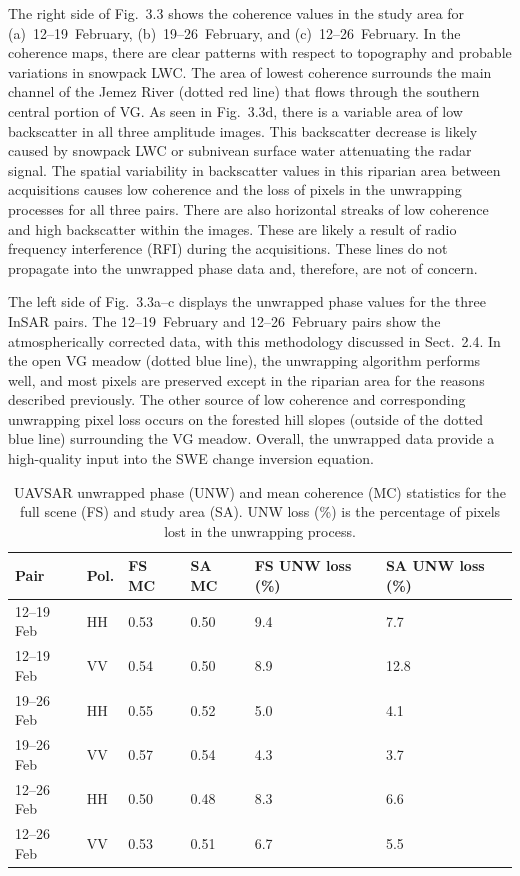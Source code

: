The right side of Fig.~3.3 shows the coherence values in the study area for (a)~12--19~February, (b)~19--26~February, and (c)~12--26~February. In the coherence maps, there are clear patterns with respect to topography and probable variations in snowpack LWC. The area of lowest coherence surrounds the main channel of the Jemez River (dotted red line) that flows through the southern central portion of VG. As seen in Fig.~3.3d, there is a variable area of low backscatter in all three amplitude images. This backscatter decrease is likely caused by snowpack LWC or subnivean surface water attenuating the radar signal. The spatial variability in backscatter values in this riparian area between acquisitions causes low coherence and the loss of pixels in the unwrapping processes for all three pairs. There are also horizontal streaks of low coherence and high backscatter within the images. These are likely a result of radio frequency interference (RFI) during the acquisitions. These lines do not propagate into the unwrapped phase data and, therefore, are not of concern.

The left side of Fig.~3.3a--c displays the unwrapped phase values for the three InSAR pairs. The 12--19~February and 12--26~February pairs show the atmospherically corrected data, with this methodology discussed in Sect.~2.4. In the open VG meadow (dotted blue line), the unwrapping algorithm performs well, and most pixels are preserved except in the riparian area for the reasons described previously. The other source of low coherence and corresponding unwrapping pixel loss occurs on the forested hill slopes (outside of the dotted blue line) surrounding the VG meadow. Overall, the unwrapped data provide a high-quality input into the SWE change inversion equation.

\begin{table}[t]
\centering
\caption{UAVSAR unwrapped phase (UNW) and mean coherence (MC) statistics for the full scene (FS) and study area (SA). UNW loss (\%) is the percentage of pixels lost in the unwrapping process.}
\begin{tabular}{l l l l l l}
\toprule
Pair & Pol. & FS MC & SA MC & FS UNW loss (\%) & SA UNW loss (\%) \\
\midrule
12--19 Feb & HH & 0.53 & 0.50 & 9.4 & 7.7 \\
12--19 Feb & VV & 0.54 & 0.50 & 8.9 & 12.8 \\
19--26 Feb & HH & 0.55 & 0.52 & 5.0 & 4.1 \\
19--26 Feb & VV & 0.57 & 0.54 & 4.3 & 3.7 \\
12--26 Feb & HH & 0.50 & 0.48 & 8.3 & 6.6 \\
12--26 Feb & VV & 0.53 & 0.51 & 6.7 & 5.5 \\
\bottomrule
\end{tabular}
\end{table}

